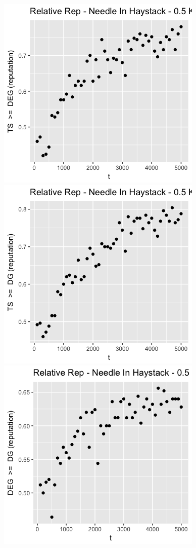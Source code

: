 \documentclass[11pt,letterpaper]{article}
\begin{document}
\includegraphics[scale=0.5]{ts_deg_nih_10_prelim} \\
\includegraphics[scale=0.5]{ts_dg_nih_10_prelim} \\
\includegraphics[scale=0.5]{deg_dg_nih_10_prelim} \\
\end{document}
